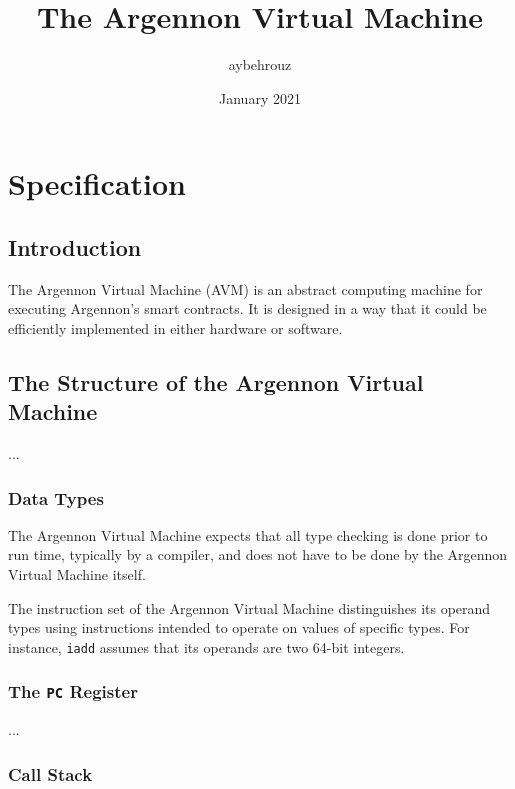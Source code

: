 \documentclass[a4paper]{report}
\title{The Argennon Virtual Machine}
\author{aybehrouz}
\date{January 2021}
\begin{document}
    \maketitle
    \tableofcontents


    \chapter{Specification}\label{ch:specification}


    \section{Introduction}\label{sec:introduction}

    The Argennon Virtual Machine (AVM) is an abstract computing machine for executing Argennon's smart contracts. It
    is designed in a way that it could be efficiently implemented in either hardware or software.


    \section{The Structure of the Argennon Virtual Machine}\label{sec:the-structure-of-the-algorand-virtual-machine}

    ...

    \subsection{Data Types}\label{subsec:data-types}

    The Argennon Virtual Machine expects that all type checking is done prior to run time, typically by a compiler,
    and does not have to be done by the Argennon Virtual Machine itself.

    The instruction set of the Argennon Virtual Machine distinguishes its operand types using instructions intended to
    operate on values of specific types. For instance, \texttt{iadd} assumes that its operands are two 64-bit integers.

    \subsection{The \texttt{PC} Register}\label{subsec:the-pc-register}

    ...

    \subsection{Call Stack}\label{subsec:call-stack}
\end{document}
